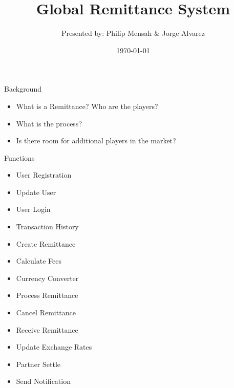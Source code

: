 \documentclass{beamer}
\title{Global Remittance System}
\author{Presented by: Philip Mensah \& Jorge Alvarez}
\institute{UNLV}
\date{\today}
\begin{document}
\begin{frame}
  \titlepage
\end{frame}



\begin{frame}{Background}
    \begin{itemize}
        \item What is a Remittance? Who are the players?
        \item What is the process?
        \item Is there room for additional players in the market?
    \end{itemize}
    
\end{frame}



\begin{frame}{Functions}
    \begin{multicols}{2}
        \begin{itemize}
            \item User Registration
    \item Update User
    \item User Login
    \item Transaction History
    \item Create Remittance
    \item Calculate Fees
    \item Currency Converter
        \end{itemize}
    \columnbreak
    \begin{itemize}
        \item Process Remittance
    \item Cancel Remittance
    \item Receive Remittance
    \item Update Exchange Rates
    \item Partner Settle
    \item Send Notification
    \end{itemize}
    \end{multicols}
    
\end{frame}
\end{document}
